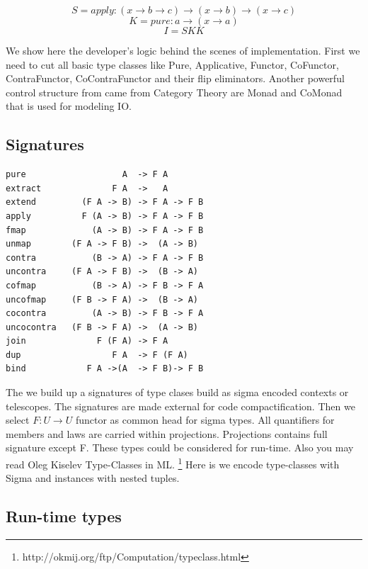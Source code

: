 \documentclass{article}
\begin{document}
\begin{equation}
 S = apply : (x \rightarrow b \rightarrow c) \rightarrow (x \rightarrow b) \rightarrow (x \rightarrow c)
\end{equation}
\begin{equation}
 K = pure  : a \rightarrow (x \rightarrow a)
\end{equation}
\begin{equation}
 I = S K K
\end{equation}

We show here the developer's logic behind the scenes of implementation. First we need
to cut all basic type classes like Pure, Applicative, Functor, CoFunctor,
ContraFunctor, CoContraFunctor and their flip eliminators. Another powerful control
structure from came from Category Theory are Monad and CoMonad that is used
for modeling IO.

\subsection{Signatures}

\begin{lstlisting}[mathescape=true]
pure                   A  -> F A
extract              F A  ->   A
extend         (F A -> B) -> F A -> F B
apply          F (A -> B) -> F A -> F B
fmap             (A -> B) -> F A -> F B
unmap        (F A -> F B) ->  (A -> B)
contra           (B -> A) -> F A -> F B
uncontra     (F A -> F B) ->  (B -> A)
cofmap           (B -> A) -> F B -> F A
uncofmap     (F B -> F A) ->  (B -> A)
cocontra         (A -> B) -> F B -> F A
uncocontra   (F B -> F A) ->  (A -> B)
join              F (F A) -> F A
dup                  F A  -> F (F A)
bind            F A ->(A  -> F B)-> F B
\end{lstlisting}

The we build up a signatures of type clases build as sigma encoded contexts or telescopes.
The signatures are made external for code compactification.
Then we select $F: U \rightarrow U$ functor as common head for sigma types.
All quantifiers for members and laws are carried within projections.
Projections contains full signature except F. These types could be considered for run-time.
Also you may read Oleg Kiselev Type-Classes in ML. \footnote{http://okmij.org/ftp/Computation/typeclass.html}
Here is we encode type-classes with Sigma and instances with nested tuples.

\newpage
\subsection{Run-time types}
\end{document}

